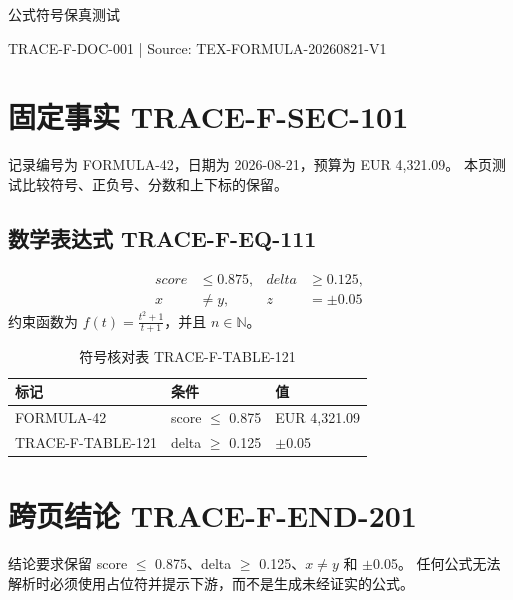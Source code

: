 \documentclass[11pt,a4paper]{ctexart}
\begin{document}
\begin{center}
{\LARGE 公式符号保真测试}\par
{\small TRACE-F-DOC-001 | Source: TEX-FORMULA-20260821-V1}
\end{center}

\section{固定事实 TRACE-F-SEC-101}
记录编号为 FORMULA-42，日期为 2026-08-21，预算为 EUR 4,321.09。
本页测试比较符号、正负号、分数和上下标的保留。

\subsection{数学表达式 TRACE-F-EQ-111}
\begin{align}
  score &\leq 0.875, & delta &\geq 0.125, \\
  x &\neq y, & z &= \pm 0.05
  \tag{TRACE-F-EQ-111}
\end{align}
约束函数为 $f(t)=\frac{t^2+1}{t+1}$，并且 $n\in\mathbb{N}$。

\begin{table}[h]
\centering
\caption{符号核对表 TRACE-F-TABLE-121}
\begin{tabular}{lll}
\toprule
标记 & 条件 & 值\\
\midrule
FORMULA-42 & score $\leq$ 0.875 & EUR 4,321.09\\
TRACE-F-TABLE-121 & delta $\geq$ 0.125 & $\pm$0.05\\
\bottomrule
\end{tabular}
\end{table}

\newpage
\section{跨页结论 TRACE-F-END-201}
结论要求保留 score $\leq$ 0.875、delta $\geq$ 0.125、$x\neq y$ 和 $\pm$0.05。
任何公式无法解析时必须使用占位符并提示下游，而不是生成未经证实的公式。
\end{document}
